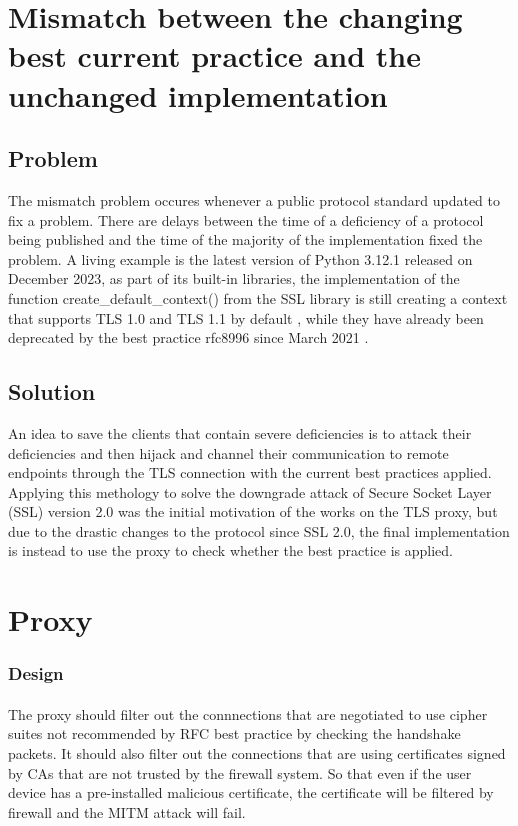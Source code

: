 \documentclass[mscthesis]{usiinfthesis}
\begin{document}
\section{Mismatch between the changing best current practice and the unchanged implementation}
\subsection{Problem}
The mismatch problem occures whenever a public protocol standard updated to fix a problem. There are delays between the time of a deficiency of a protocol being published and the time of the majority of the implementation fixed the problem. A living example is the latest version of Python 3.12.1 released on December 2023, as part of its built-in libraries, the implementation of the function create\_default\_context() from the SSL library is still creating a context that supports TLS 1.0 and TLS 1.1 by default \citep{pyton:ssl}, while they have already been deprecated by the best practice rfc8996 since March 2021 \citep{rfc:notls11}.

\subsection{Solution}
An idea to save the clients that contain severe deficiencies is to attack their deficiencies and then hijack and channel their communication to remote endpoints through the TLS connection with the current best practices applied. Applying this methology to solve the downgrade attack of Secure Socket Layer (SSL) version 2.0 was the initial motivation of the works on the TLS proxy, but due to the drastic changes to the protocol since SSL 2.0, the final implementation is instead to use the proxy to check whether the best practice is applied.


\section{Proxy}
\subsubsection{Design}
\paragraph{}
The proxy should filter out the connnections that are negotiated to use cipher suites not recommended by RFC best practice by checking the handshake packets. It should also filter out the connections that are using certificates signed by CAs that are not trusted by the firewall system. So that even if the user device has a pre-installed malicious certificate, the certificate will be filtered by firewall and the MITM attack will fail.
\end{document}

